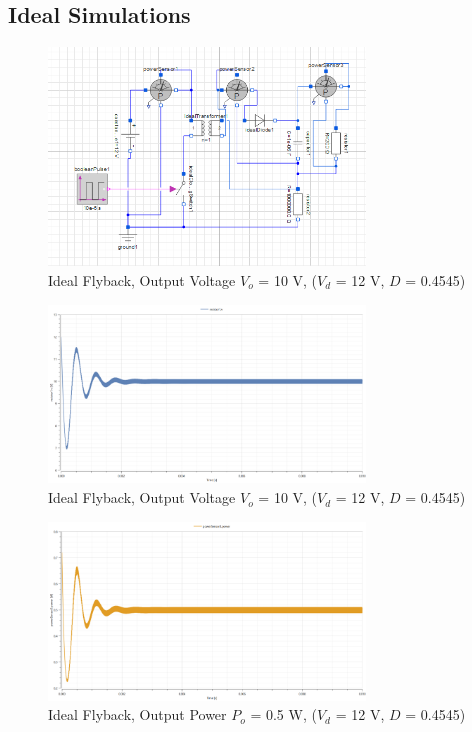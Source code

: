 \documentclass[12pt,twoside]{scrartcl}
\begin{document}
\subsection{Ideal Simulations}

\begin{figure}[htp]
    \centering
    \includegraphics[width=0.75\textwidth]{ModellicaIdeal.PNG}
    \caption{Ideal Flyback, Output Voltage $V_o$ = 10 V, ($V_d$ = 12 V, $D$ = 0.4545)}
    \label{fig:IdealModellica}
\end{figure}

\newpage

\begin{figure}[htp]
    \centering
    \includegraphics[width=0.75\textwidth]{IdealSim12V.png}
    \caption{Ideal Flyback, Output Voltage $V_o$ = 10 V, ($V_d$ = 12 V, $D$ = 0.4545)}
    \label{fig:IdealSim12V}
\end{figure}

\begin{figure}[htp]
    \centering
    \includegraphics[width=0.75\textwidth]{PowerIdealSim12V.png}
    \caption{Ideal Flyback, Output Power $P_o$ = 0.5 W, ($V_d$ = 12 V, $D$ = 0.4545)}
    \label{fig:PowerIdealSim12V}
\end{figure}
\end{document}
